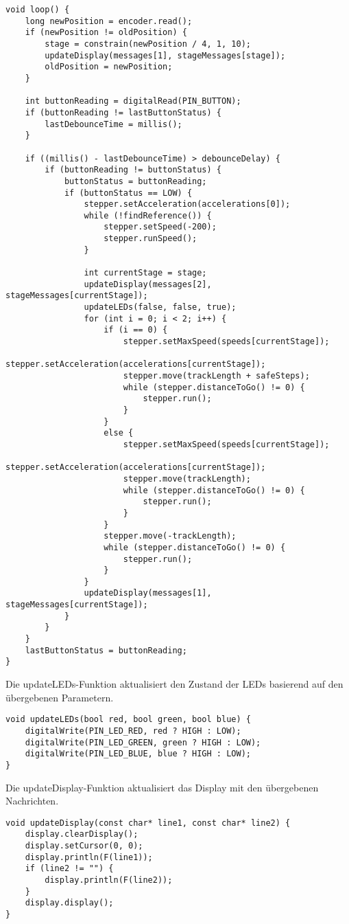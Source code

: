 \begin{lstlisting}
void loop() {
	long newPosition = encoder.read();
	if (newPosition != oldPosition) {
		stage = constrain(newPosition / 4, 1, 10);
		updateDisplay(messages[1], stageMessages[stage]);
		oldPosition = newPosition;
	}
	
	int buttonReading = digitalRead(PIN_BUTTON);
	if (buttonReading != lastButtonStatus) {
		lastDebounceTime = millis();
	}
	
	if ((millis() - lastDebounceTime) > debounceDelay) {
		if (buttonReading != buttonStatus) {
			buttonStatus = buttonReading;
			if (buttonStatus == LOW) {
				stepper.setAcceleration(accelerations[0]);
				while (!findReference()) {
					stepper.setSpeed(-200);
					stepper.runSpeed();
				}
				
				int currentStage = stage;
				updateDisplay(messages[2], stageMessages[currentStage]);
				updateLEDs(false, false, true);
				for (int i = 0; i < 2; i++) {
					if (i == 0) {
						stepper.setMaxSpeed(speeds[currentStage]);
						stepper.setAcceleration(accelerations[currentStage]);
						stepper.move(trackLength + safeSteps);
						while (stepper.distanceToGo() != 0) {
							stepper.run();
						}
					}
					else {
						stepper.setMaxSpeed(speeds[currentStage]);
						stepper.setAcceleration(accelerations[currentStage]);
						stepper.move(trackLength);
						while (stepper.distanceToGo() != 0) {
							stepper.run();
						}
					}
					stepper.move(-trackLength);
					while (stepper.distanceToGo() != 0) {
						stepper.run();
					}
				}
				updateDisplay(messages[1], stageMessages[currentStage]);
			}
		}
	}
	lastButtonStatus = buttonReading;
}
\end{lstlisting}

Die updateLEDs-Funktion aktualisiert den Zustand der LEDs basierend auf den übergebenen Parametern.

\begin{lstlisting}
void updateLEDs(bool red, bool green, bool blue) {
	digitalWrite(PIN_LED_RED, red ? HIGH : LOW);
	digitalWrite(PIN_LED_GREEN, green ? HIGH : LOW);
	digitalWrite(PIN_LED_BLUE, blue ? HIGH : LOW);
}
\end{lstlisting}

Die updateDisplay-Funktion aktualisiert das Display mit den übergebenen Nachrichten.

\begin{lstlisting}
void updateDisplay(const char* line1, const char* line2) {
	display.clearDisplay();
	display.setCursor(0, 0);
	display.println(F(line1));
	if (line2 != "") {
		display.println(F(line2));
	}
	display.display();
}
\end{lstlisting}


